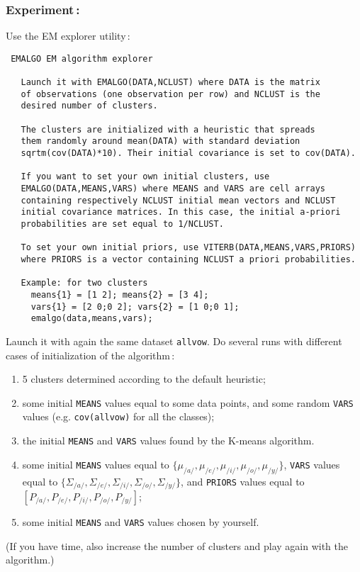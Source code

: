 \documentclass[twoside,a4paper,titlepage]{article}
\newcommand{\com}[1]{{\tt #1}}
\begin{document}
\subsubsection*{Experiment\,:}
Use the EM explorer utility\,:
\begin{verbatim}
 EMALGO EM algorithm explorer

   Launch it with EMALGO(DATA,NCLUST) where DATA is the matrix
   of observations (one observation per row) and NCLUST is the
   desired number of clusters.

   The clusters are initialized with a heuristic that spreads
   them randomly around mean(DATA) with standard deviation
   sqrtm(cov(DATA)*10). Their initial covariance is set to cov(DATA).

   If you want to set your own initial clusters, use
   EMALGO(DATA,MEANS,VARS) where MEANS and VARS are cell arrays
   containing respectively NCLUST initial mean vectors and NCLUST
   initial covariance matrices. In this case, the initial a-priori
   probabilities are set equal to 1/NCLUST.

   To set your own initial priors, use VITERB(DATA,MEANS,VARS,PRIORS)
   where PRIORS is a vector containing NCLUST a priori probabilities.

   Example: for two clusters
     means{1} = [1 2]; means{2} = [3 4];
     vars{1} = [2 0;0 2]; vars{2} = [1 0;0 1];
     emalgo(data,means,vars);

\end{verbatim}
Launch it with again the same dataset \com{allvow}. Do several runs with
different cases of initialization of the algorithm\,:
\begin{enumerate}
\item 5 clusters determined according to the default heuristic;
\item some initial \com{MEANS} values equal to some data points, and some
random \com{VARS} values (e.g. \com{cov(allvow)} for all the classes);
\item the initial \com{MEANS} and \com{VARS} values found by the K-means algorithm.
\item some initial \com{MEANS} values equal to $\{\mu_{/a/}, \mu_{/e/},
\mu_{/i/}, \mu_{/o/}, \mu_{/y/}\}$, \com{VARS} values equal to \linebreak
$\{\Sigma_{/a/}, \Sigma_{/e/}, \Sigma_{/i/}, \Sigma_{/o/}, \Sigma_{/y/}\}$,
and \com{PRIORS} values equal to
$[P_{/a/},P_{/e/},P_{/i/},P_{/o/},P_{/y/}]$;
\item some initial \com{MEANS} and \com{VARS} values chosen by yourself.
\end{enumerate}
(If you have time, also increase the number of clusters and play again with
the algorithm.)
\end{document}
